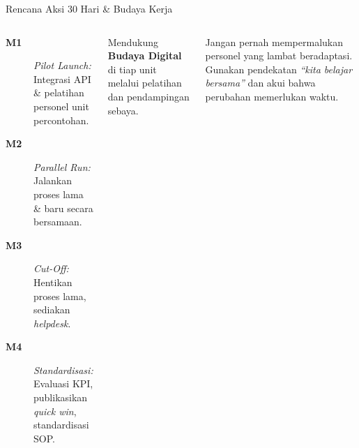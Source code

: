 \documentclass[aspectratio=169,11pt]{beamer}
\begin{document}
\begin{frame}{Rencana Aksi 30 Hari \& Budaya Kerja}
    \begin{columns}[T]
        \begin{premiumbox}
            \scriptsize
            \begin{description}
                \item[\textbf{M1}] \textit{Pilot Launch:} Integrasi API \& pelatihan personel unit percontohan.
                \item[\textbf{M2}] \textit{Parallel Run:} Jalankan proses lama \& baru secara bersamaan.
                \item[\textbf{M3}] \textit{Cut-Off:} Hentikan proses lama, sediakan \textit{helpdesk}.
                \item[\textbf{M4}] \textit{Standardisasi:} Evaluasi KPI, publikasikan \textit{quick win}, standardisasi SOP.
            \end{description}
        \end{premiumbox}
        
        \begin{orangebox}
            \small Mendukung \textbf{Budaya Digital} di tiap unit melalui pelatihan dan pendampingan sebaya.
        \end{orangebox}
        \vspace{0.2cm}
        \begin{greenbox}
            \scriptsize
            Jangan pernah mempermalukan personel yang lambat beradaptasi. Gunakan pendekatan \textit{``kita belajar bersama''} dan akui bahwa perubahan memerlukan waktu.
        \end{greenbox}
    \end{columns}
\end{frame}
\end{document}

